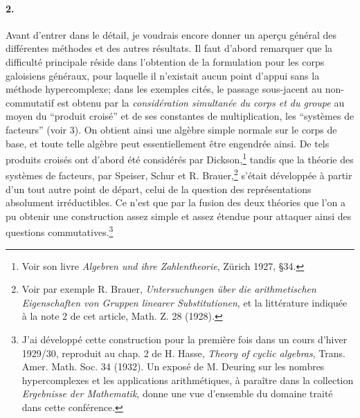 \paragraph{2.}
Avant d'entrer dans le détail, je voudrais encore donner un aperçu général des différentes méthodes et des autres résultats. Il faut d'abord remarquer que la difficulté principale réside dans l'obtention de la formulation pour les corps galoisiens généraux, pour laquelle il n'existait aucun point d'appui sans la méthode hypercomplexe; dans les exemples cités, le passage sous-jacent au non-commutatif est obtenu par la \emph{considération simultanée du corps et du groupe} au moyen du ``produit croisé'' et de ses constantes de multiplication, les ``systèmes de facteurs'' (voir 3). On obtient ainsi une algèbre simple normale sur le corps de base, et toute telle algèbre peut essentiellement être engendrée ainsi. De tels produits croisés ont d'abord été considérés par Dickson,\footnote{Voir son livre \emph{Algebren und ihre Zahlentheorie}, Zürich 1927, \S 34.} tandis que la théorie des systèmes de facteurs, par Speiser, Schur et R. Brauer,\footnote{Voir par exemple R. Brauer, \emph{Untersuchungen über die arithmetischen Eigenschaften von Gruppen linearer Substitutionen}, et la littérature indiquée à la note 2 de cet article, Math. Z. 28 (1928).} s'était développée à partir d'un tout autre point de départ, celui de la question des représentations absolument irréductibles. Ce n'est que par la fusion des deux théories que l'on a pu obtenir une construction assez simple et assez étendue pour attaquer ainsi des questions commutatives.\footnote{J'ai développé cette construction pour la première fois dans un cours d'hiver 1929/30, reproduit au chap. 2 de H. Hasse, \emph{Theory of cyclic algebras}, Trans. Amer. Math. Soc. 34 (1932). Un exposé de M. Deuring sur les nombres hypercomplexes et les applications arithmétiques, à paraître dans la collection \emph{Ergebnisse der Mathematik}, donne une vue d'ensemble du domaine traité dans cette conférence.}

